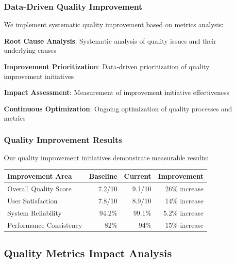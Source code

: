 \subsubsection*{Data-Driven Quality Improvement}

We implement systematic quality improvement based on metrics analysis:

\begin{expandedlist}
    \item \textbf{Root Cause Analysis}: Systematic analysis of quality issues and their underlying causes
    \item \textbf{Improvement Prioritization}: Data-driven prioritization of quality improvement initiatives
    \item \textbf{Impact Assessment}: Measurement of improvement initiative effectiveness
    \item \textbf{Continuous Optimization}: Ongoing optimization of quality processes and metrics
\end{expandedlist}

\subsubsection*{Quality Improvement Results}

Our quality improvement initiatives demonstrate measurable results:

\begin{center}
\begin{tabular}{@{}lrrr@{}}
\toprule
\textbf{Improvement Area} & \textbf{Baseline} & \textbf{Current} & \textbf{Improvement} \\
\midrule
Overall Quality Score & 7.2/10 & 9.1/10 & 26\% increase \\
User Satisfaction & 7.8/10 & 8.9/10 & 14\% increase \\
System Reliability & 94.2\% & 99.1\% & 5.2\% increase \\
Performance Consistency & 82\% & 94\% & 15\% increase \\
\bottomrule
\end{tabular}
\end{center}

\subsection*{Quality Metrics Impact Analysis}

